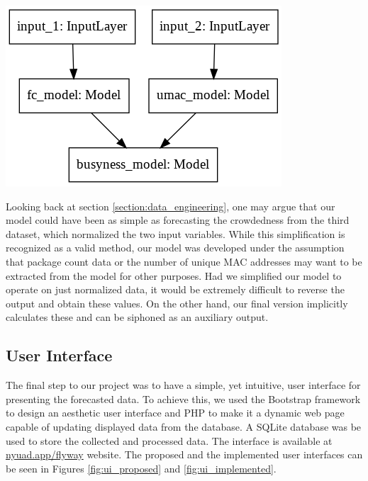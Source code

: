 \documentclass[journal, 12pt]{IEEEtran}
\begin{document}
\begingroup
    \center
    \medskip
    \includegraphics[width=\columnwidth]{./images/v3_model_high.png}
    \label{fig:v3}
    \medskip
\endgroup

\noindent Looking back at section \ref{section:data_engineering}, one may argue that our model could have been as simple as forecasting the crowdedness from the third dataset, which normalized the two input variables. While this simplification is recognized as a valid method, our model was developed under the assumption that package count data or the number of unique MAC addresses may want to be extracted from the model for other purposes. Had we simplified our model to operate on just normalized data, it would be extremely difficult to reverse the output and obtain these values. On the other hand, our final version implicitly calculates these and can be siphoned as an auxiliary output. 

\subsection{User Interface} 
\noindent The final step to our project was to have a simple, yet intuitive, user interface for presenting the forecasted data. To achieve this, we used the Bootstrap framework to design an aesthetic user interface and PHP to make it a dynamic web page capable of updating displayed data from the database. A SQLite database was be used to store the collected and processed data. The interface is available at \href{https://nyuad.app/flyway}{nyuad.app/flyway} website. The proposed and the implemented user interfaces can be seen in Figures \ref{fig:ui_proposed} and \ref{fig:ui_implemented}.\\
\end{document}
